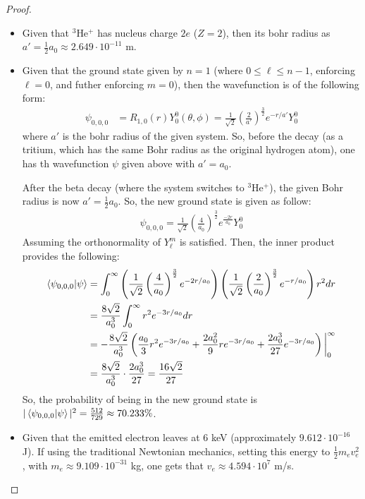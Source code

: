 \documentclass{article}
\begin{document}
\begin{proof}
\begin{itemize}
        \item[(c)] Given that $^3$He$^+$ has nucleus charge $2e$ ($Z=2$), then its bohr radius as $a' = \frac{1}{2}a_0 \approx 2.649\cdot 10^{-11}$ m.
        
        \hfil

        \item[(d)] Given that the ground state given by $n=1$ (where $0\leq \ell\leq n-1$, enforcing $\ell=0$, and futher enforcing $m=0$), then the wavefunction is of the following form:
        \begin{align}
            \psi_{0,0,0} &= R_{1,0}(r)Y^0_0(\theta,\phi) = \frac{1}{\sqrt{2}}\left(\frac{2}{a'}\right)^\frac{3}{2}e^{-r/a'}Y^0_0
        \end{align}
        where $a'$ is the bohr radius of the given system. So, before the decay (as a tritium, which has the same Bohr radius as the original hydrogen atom), one has th wavefunction $\psi$ given above with $a'=a_0$.

        After the beta decay (where the system switches to $^3$He$^+$), the given Bohr radius is now $a'=\frac{1}{2}a_0$. So, the new ground state is given as follow:
        \begin{align}
            \psi_{0,0,0} = \frac{1}{\sqrt{2}}\left(\frac{4}{a_0}\right)^\frac{3}{2}e^{\frac{-2r}{a_0}}Y^0_0
        \end{align}
        Assuming the orthonormality of $Y^m_\ell$ is satisfied. Then, the inner product provides the following:
        \begin{align}
            \braket{\psi_{0,0,0}}{\psi} &= \int_{0}^{\infty}\left(\frac{1}{\sqrt{2}}\left(\frac{4}{a_0}\right)^\frac{3}{2}e^{-2r/a_0}\right)\left(\frac{1}{\sqrt{2}}\left(\frac{2}{a_0}\right)^\frac{3}{2}e^{-r/a_0}\right)r^2 dr\\
            &= \frac{8\sqrt{2}}{a_0^3}\int_{0}^{\infty}r^2e^{-3r/a_0}dr\\
            &= -\frac{8\sqrt{2}}{a_0^3}\left(\frac{a_0}{3}r^2e^{-3r/a_0}+\frac{2a_0^2}{9}re^{-3r/a_0}+\frac{2a_0^3}{27}e^{-3r/a_0}\right)\bigg|_{0}^{\infty}\\
            &= \frac{8\sqrt{2}}{a_0^3}\cdot\frac{2a_0^3}{27}= \frac{16\sqrt{2}}{27}
        \end{align}
        So, the probability of being in the new ground state is $|\braket{\psi_{0,0,0}}{\psi}|^2 = \frac{512}{729}\approx 70.233\%$.
        
        \hfil

        \item[(e)] Given that the emitted electron leaves at $6$ keV (approximately $9.612\cdot 10^{-16}$ J). If using the traditional Newtonian mechanics, setting this energy to $\frac{1}{2}m_e v_e^2$, with $m_e\approx 9.109\cdot 10^{-31}$ kg, one gets that $v_e \approx 4.594\cdot 10^7$ m/s.
        

\end{itemize}
\end{proof}
\end{document}
